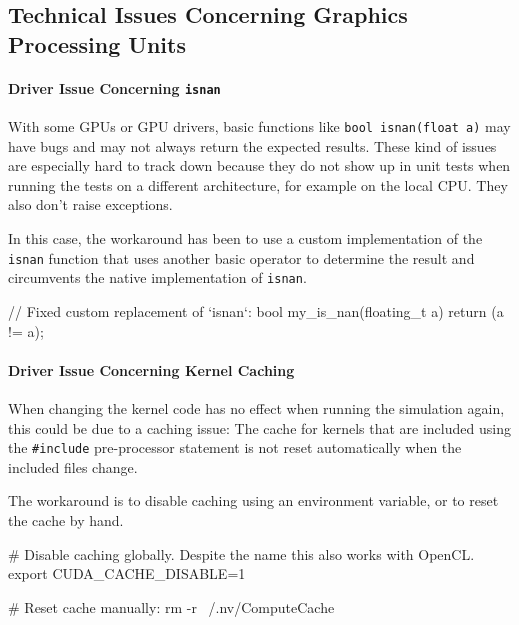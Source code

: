 \subsection{Technical Issues Concerning Graphics Processing Units}
\label{sec:gpu_technical_issues}

\paragraph{Driver Issue Concerning \texttt{isnan}}

With some GPUs or GPU drivers, basic functions like
\texttt{bool\ isnan(float\ a)} may have bugs and may not always return
the expected results. These kind of issues are especially hard to track
down because they do not show up in unit tests when running the tests on
a different architecture, for example on the local CPU. They also don't
raise exceptions.

In this case, the workaround has been to use a custom implementation of
the \texttt{isnan} function that uses another basic operator to
determine the result and circumvents the native implementation of
\texttt{isnan}.

\begin{ccode}
// Fixed custom replacement of `isnan`:
bool my_is_nan(floating_t a) { return (a != a); }
\end{ccode}


\paragraph{Driver Issue Concerning Kernel Caching}

When changing the kernel code has no effect when running the simulation
again, this could be due to a caching issue: The cache for kernels that
are included using the \texttt{\#include} pre-processor statement is not
reset automatically when the included files change.

The workaround is to disable caching using an environment variable, or
to reset the cache by hand.

\begin{bash}
# Disable caching globally. Despite the name this also works with OpenCL.
export CUDA_CACHE_DISABLE=1

# Reset cache manually:
rm -r ~/.nv/ComputeCache
\end{bash}

